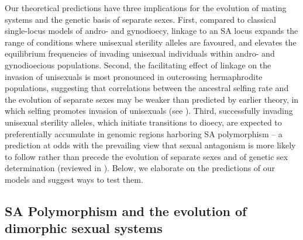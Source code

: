 \documentclass{article}
\begin{document}
Our theoretical predictions have three implications for the evolution of mating systems and the genetic basis of separate sexes. First, compared to classical single-locus models of andro- and gynodioecy, linkage to an SA locus expands the range of conditions where unisexual sterility alleles are favoured, and elevates the equilibrium frequencies of invading unisexual individuals within andro- and gynodioecious populations. Second, the facilitating effect of linkage on the invasion of unisexuals is most pronounced in outcrossing hermaphrodite populations, suggesting that correlations between the ancestral selfing rate and the evolution of separate sexes may be weaker than predicted by earlier theory, in which selfing promotes invasion of unisexuals (see \citealt{Charlesworth1978a}). Third, successfully invading unisexual sterility alleles, which initiate transitions to dioecy, are expected to preferentially accumulate in genomic regions harboring SA polymorphism -- a prediction at odds with the prevailing view that sexual antagonism is more likely to follow rather than precede the evolution of separate sexes and of genetic sex determination (reviewed in \citealt{CharlesworthEtAl2005,Bachtrog2006}). Below, we elaborate on the predictions of our models and suggest ways to test them.

\subsection*{SA Polymorphism and the evolution of dimorphic sexual systems} 
\end{document}
